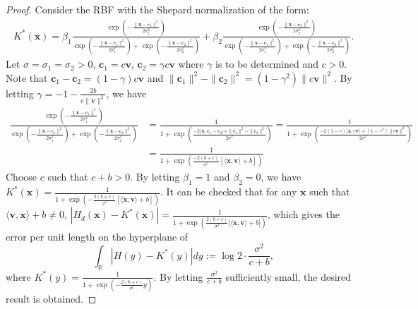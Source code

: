 \documentclass[10pt,a4paper]{amsart}
\newcommand{\bc}{\mathbf{c}}
\newcommand{\bv}{\mathbf{v}}
\newcommand{\bx}{\mathbf{x}}
\begin{document}
\begin{proof}
    Consider the RBF with the Shepard normalization of the form:
    \begin{align*}
        K^*(\bx) = \beta_1 \frac{\exp(-\frac{\|\bx-\bc_1\|^2}{2\sigma_1^2})}{\exp(-\frac{\|\bx-\bc_1\|^2}{2\sigma_1^2})+\exp(-\frac{\|\bx-\bc_2\|^2}{2\sigma_2^2})}
        + \beta_2 \frac{\exp(-\frac{\|\bx-\bc_2\|^2}{2\sigma_2^2})}{\exp(-\frac{\|\bx-\bc_1\|^2}{2\sigma_1^2})+\exp(-\frac{\|\bx-\bc_2\|^2}{2\sigma_2^2})}.
    \end{align*}
    Let $\sigma=\sigma_1=\sigma_2>0$, $\bc_1=c\bv$, $\bc_2 = \gamma c\bv$
    where $\gamma$ is to be determined and $c > 0$.
    Note that $\bc_1-\bc_2 = (1-\gamma)c\bv$ and
    $
    \|\bc_1\|^2-\|\bc_2\|^2 = (1-\gamma^2)\|c\bv\|^2.
    $
    By letting $\gamma = -1-\frac{2b}{c\|\bv\|^2}$, we have
    \begin{align*}
        \frac{\exp(-\frac{\|\bx-\bc_1\|^2}{2\sigma_1^2})}{\exp(-\frac{\|\bx-\bc_1\|^2}{2\sigma_1^2})+\exp(-\frac{\|\bx-\bc_2\|^2}{2\sigma_2^2})}
        &= \frac{1}{1 + \exp(\frac{-2\langle \bx, \bc_1-\bc_2 \rangle + \|\bc_1\|^2-\|\bc_2\|^2}{2\sigma^2})}
        = \frac{1}{1 + \exp(\frac{-2(1-\gamma)\langle \bx, c\bv \rangle + (1-\gamma^2)\|c\bv\|^2}{2\sigma^2})}
        \\
        &=\frac{1}{1 + \exp(\frac{-2(b+c)}{\sigma^2}\left[\langle \bx, \bv \rangle +b\right])}
    \end{align*}
    Choose $c$ such that $c + b > 0$.
    By letting $\beta_1 = 1$ and $\beta_2 = 0$, 
    we have $K^*(\bx) = \frac{1}{1 + \exp(-\frac{2(b+c)}{\sigma^2}\left[\langle \bx, \bv \rangle +b\right])}$.
    It can be checked that for any $\bx$ such that $\langle \bv, \bx \rangle + b\ne 0$, 
    $|H_d(\bx)-K^*(\bx)|= \frac{1}{1 + \exp(\frac{2(b+c)}{\sigma^2}|\langle \bx, \bv \rangle +b|)}$, which gives
    the error per unit length on the hyperplane of
    \begin{equation}\label{eq:analytic_formula}
    \int_{\mathbb{R}} |H(y) - K^*(y)| dy := \log 2 \cdot \frac{\sigma^2}{c+b},
    \end{equation}
    where $K^*(y) = \frac{1}{1 + \exp(-\frac{2(b+c)}{\sigma^2}y)}$.
    By letting $\frac{\sigma^2}{c+b}$ sufficiently small, the desired result is obtained.
\end{proof}
\end{document}
